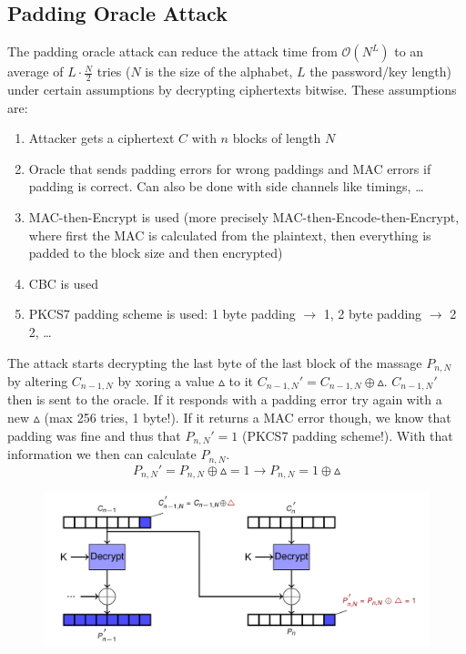 \subsection{Padding Oracle Attack}
The padding oracle attack can reduce the attack time from $\mathcal{O}(N^L)$ to an average of $L \cdot \frac{N}{2}$ tries ($N$ is the size of the alphabet, $L$ the password/key length) under certain assumptions by decrypting ciphertexts bitwise.
These assumptions are:
\begin{enumerate}
  \item Attacker gets a ciphertext $C$ with $n$ blocks of length $N$
  \item Oracle that sends padding errors for wrong paddings and MAC errors if padding is correct.
    Can also be done with side channels like timings, \dots
  \item MAC-then-Encrypt is used (more precisely MAC-then-Encode-then-Encrypt, where first the MAC is calculated from the plaintext, then everything is padded to the block size and then encrypted)
  \item CBC is used
  \item PKCS7 padding scheme is used: 1 byte padding $\rightarrow$ 1, 2 byte padding $\rightarrow$ 2 2, \dots
\end{enumerate}

The attack starts decrypting the last byte of the last block of the massage $P_{n,N}$ by altering $C_{n-1,N}$ by xoring a value $\vartriangle$ to it $C_{n-1,N}' = C_{n-1,N} \oplus \vartriangle$.
$C_{n-1,N}'$ then is sent to the oracle.
If it responds with a padding error try again with a new $\vartriangle$ (max 256 tries, 1 byte!).
If it returns a MAC error though, we know that padding was fine and thus that $P_{n,N}' = 1$ (PKCS7 padding scheme!).
With that information we then can calculate $P_{n,N}$.
\begin{equation*}
  P_{n,N}' = P_{n,N} \oplus \vartriangle = 1 \rightarrow P_{n,N} = 1 \oplus \vartriangle
\end{equation*}

\begin{figure}[H]
  \centering
  \includegraphics[width=.8\textwidth]{figures/padding_oracle_attack.png}
\end{figure}

